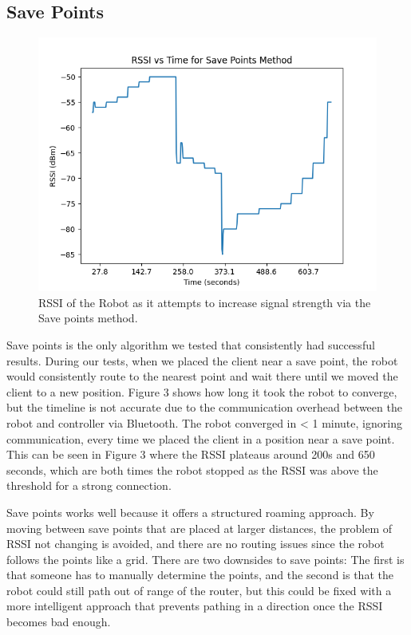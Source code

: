 \subsection{Save Points}
\begin{figure}[tp]
\centering
\includegraphics[scale=0.5]{figures/rssi_save_points}
\caption{RSSI of the Robot as it attempts to increase signal strength via the Save points method.}
\end{figure}
Save points is the only algorithm we tested that consistently had successful results. During our tests, when we placed the client near a save point, the robot would consistently route to the nearest point and wait there until we moved the client to a new position. Figure 3 shows how long it took the robot to converge, but the timeline is not accurate due to the communication overhead between the robot and controller via Bluetooth. The robot converged in < 1 minute, ignoring communication, every time we placed the client in a position near a save point. This can be seen in Figure 3 where the RSSI plateaus around 200s and 650 seconds, which are both times the robot stopped as the RSSI was above the threshold for a strong connection. 

Save points works well because it offers a structured roaming approach. By moving between save points that are placed at larger distances, the problem of RSSI not changing is avoided, and there are no routing issues since the robot follows the points like a grid. There are two downsides to save points: The first is that someone has to manually determine the points, and the second is that the robot could still path out of range of the router, but this could be fixed with a more intelligent approach that prevents pathing in a direction once the RSSI becomes bad enough. 

